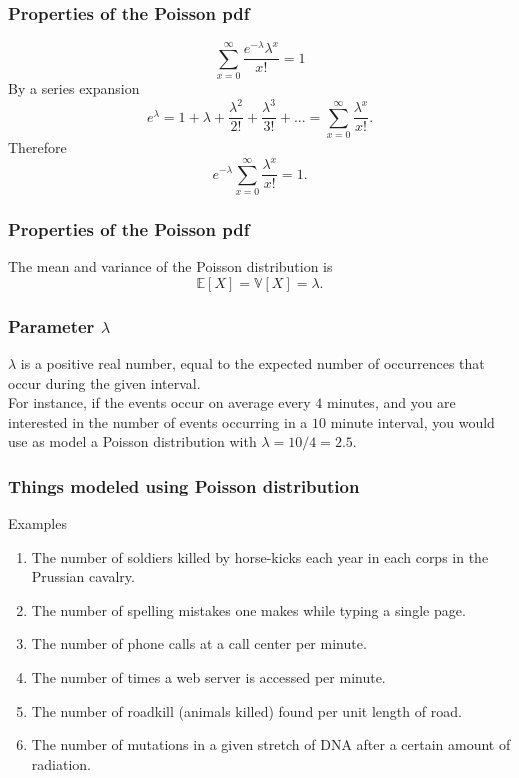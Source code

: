 \begin{frame}[fragile]\frametitle{Properties of the Poisson pdf}

$$\sum_{x=0}^\infty \frac{e^{-\lambda} \lambda^x}{x!} = 1$$
By a series expansion
$$e^{\lambda} = 1 + \lambda + \frac{\lambda^2}{2!} +
\frac{\lambda^3}{3!} +... = \sum_{x=0}^\infty \frac{\lambda^x}{x!}.$$
Therefore 
$$e^{-\lambda} \sum_{x=0}^\infty \frac{\lambda^x}{x!} = 1.$$

\end{frame}



\begin{frame}[fragile]\frametitle{Properties of the Poisson pdf}

The mean and variance of the Poisson distribution is
$$\mathbb E[X] = \mathbb V[X] = \lambda.$$

\end{frame}


\begin{frame}[fragile]\frametitle{Parameter $\lambda$}


$\lambda$ is a positive real number, equal to the expected number 
of occurrences that occur during the given interval. \\ 

For instance, if the events occur on average every $4$ minutes, and 
you are interested in the number of events occurring in a $10$ 
minute interval, you would use as model a Poisson distribution with 
$\lambda = 10/4 = 2.5$.

\end{frame}


\begin{frame}[fragile]\frametitle{Things modeled using Poisson distribution}

Examples

\begin{enumerate}
\item The number of soldiers killed by horse-kicks each year in each 
corps in the Prussian cavalry. 

\item The number of spelling mistakes one makes while typing a single
  page. 

\item The number of phone calls at a call center per minute. 

\item The number of times a web server is accessed per minute. 

\item The number of roadkill (animals killed) found per unit length of
  road. 

\item The number of mutations in a given stretch of DNA after a
  certain amount of radiation.
 
\end{enumerate}
\end{frame}



